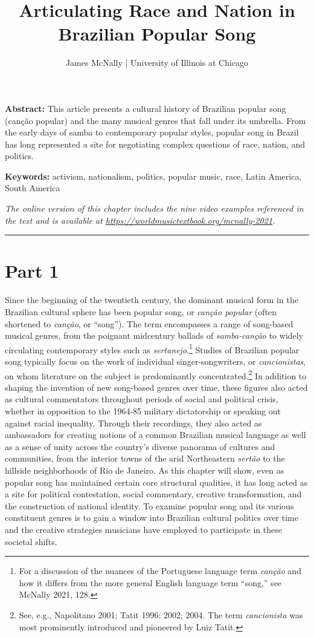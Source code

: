 \documentclass[twoside]{article}
\title{Articulating Race and Nation in Brazilian Popular Song}
\author{James McNally | University of Illinois at Chicago}
\date{}
\makeatletter
\renewcommand{\maketitle}{\bgroup\setlength{\parindent}{0pt}
\begin{flushleft}
  \vspace*{3\baselineskip}
  \huge{\textbf{\@title}}

  \medskip
  
  \large{\@author}
\end{flushleft}\egroup
}
\providecommand{\abstracttext}[1]
{
  \noindent
  \textbf{Abstract:} #1
}
\providecommand{\keywords}[1]
{
  \newline
  \textbf{Keywords:} #1
}
\providecommand{\wmturl}{\href{https://worldmusictextbook.org/mcnally-2021}{https://worldmusictextbook.org/mcnally-2021}}
\providecommand{\wmturltext}{
  \noindent\emph{The online version of this chapter includes the nine video examples referenced in the text and is available at \wmturl.}
}
\makeatother
\begin{document}
\suppressfloats %
\maketitle

\abstracttext{This article presents a cultural history of Brazilian popular song (canção popular) and the many musical genres that fall under its umbrella. From the early days of samba to contemporary popular styles, popular song in Brazil has long represented a site for negotiating complex questions of race, nation, and politics.}
\keywords{activism, nationalism, politics, popular music, race, Latin America, South America}

\smallskip

\wmturltext

\medskip

\noindent\hfil\rule{0.5\textwidth}{0.4pt}\hfil

\bigskip

\section*{Part 1}

Since the beginning of the twentieth century, the dominant musical form
in the Brazilian cultural sphere has been popular song, or \emph{canção
popular} (often shortened to \emph{canção}, or ``song''). The term
encompasses a range of song-based musical genres, from the poignant
midcentury ballads of \emph{samba-canção} to widely circulating
contemporary styles such as \emph{sertanejo}.\footnote{For a discussion
  of the nuances of the Portuguese language term \emph{canção} and how
  it differs from the more general English language term ``song,'' see
  McNally 2021, 128.} Studies of Brazilian popular song typically focus
on the work of individual singer-songwriters, or \emph{cancionistas}, on
whom literature on the subject is predominantly concentrated.\footnote{See,
  e.g., Napolitano 2001; Tatit 1996; 2002; 2004. The term
  \emph{cancionista} was most prominently introduced and pioneered by
  Luiz Tatit.} In addition to shaping the invention of new song-based
genres over time, these figures also acted as cultural commentators
throughout periods of social and political crisis, whether in opposition
to the 1964-85 military dictatorship or speaking out against racial
inequality. Through their recordings, they also acted as ambassadors for
creating notions of a common Brazilian musical language as well as a
sense of unity across the country's diverse panorama of cultures and
communities, from the interior towns of the arid Northeastern
\emph{sertão} to the hillside neighborhoods of Rio de Janeiro. As this
chapter will show, even as popular song has maintained certain core
structural qualities, it has long acted as a site for political
contestation, social commentary, creative transformation, and the
construction of national identity. To examine popular song and its
various constituent genres is to gain a window into Brazilian cultural
politics over time and the creative strategies musicians have employed
to participate in these societal shifts.
\end{document}
